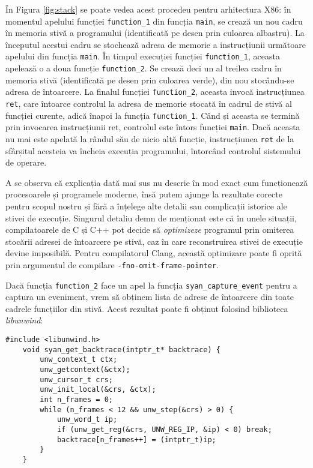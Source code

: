 În Figura \ref{fig:stack} se poate vedea acest procedeu pentru
arhitectura X86: în momentul apelului funcției \lstinline{function_1}
din funcția \lstinline{main}, se crează un nou cadru în memoria stivă a
programului (identificată pe desen prin culoarea albastru). La începutul
acestui cadru se stochează adresa de memorie a instrucțiunii următoare
apelului din funcția \lstinline{main}. În timpul execuției funcției
\lstinline{function_1}, aceasta apelează o a doua funcție
\lstinline{function_2}. Se crează deci un al treilea cadru în memoria
stivă (identificată pe desen prin culoarea verde), din nou stocându-se
adresa de întoarcere. La finalul funcției \lstinline{function_2},
aceasta invocă instrucțiunea \lstinline{ret}, care întoarce controlul la
adresa de memorie stocată în cadrul de stivă al funcției curente, adică
înapoi la funcția \lstinline{function_1}. Când și aceasta se termină
prin invocarea instrucțiunii ret, controlul este întors funcției
\lstinline{main}. Dacă aceasta nu mai este apelată la rândul său de
nicio altă funcție, instrucțiunea \lstinline{ret} de la sfârșitul
acesteia va încheia execuția programului, întorcând controlul sistemului
de operare.

A se observa că explicația dată mai sus nu descrie în mod exact cum
funcționează procesoarele și programele moderne, însă putem ajunge la
rezultate corecte pentru scopul nostru și fără a înțelege alte detalii
sau complicații istorice ale stivei de execuție. Singurul detaliu demn
de menționat este că în unele situații, compilatoarele de C și C++ pot
decide să \textit{optimizeze} programul prin omiterea stocării adresei
de întoarcere pe stivă, caz în care reconstruirea stivei de execuție
devine imposibilă. Pentru compilatorul Clang\cite{Clang}, această
optimizare poate fi oprită prin argumentul de compilare
\lstinline{-fno-omit-frame-pointer}.

Dacă funcția \lstinline{function_2} face un apel la funcția
\lstinline{syan_capture_event} pentru a captura un eveniment, vrem să
obținem lista de adrese de întoarcere din toate cadrele funcțiilor din
stivă. Acest rezultat poate fi obținut folosind biblioteca
\textit{libunwind}\cite{libunwind}:

\begin{lstlisting}[caption=Capturarea stivei de execuție folosind
                           \lstinline{libunwind}]
    #include <libunwind.h>
    void syan_get_backtrace(intptr_t* backtrace) {
        unw_context_t ctx;
        unw_getcontext(&ctx);
        unw_cursor_t crs;
        unw_init_local(&crs, &ctx);
        int n_frames = 0;
        while (n_frames < 12 && unw_step(&crs) > 0) {
            unw_word_t ip;
            if (unw_get_reg(&crs, UNW_REG_IP, &ip) < 0) break;
            backtrace[n_frames++] = (intptr_t)ip;
        }
    }
\end{lstlisting}

